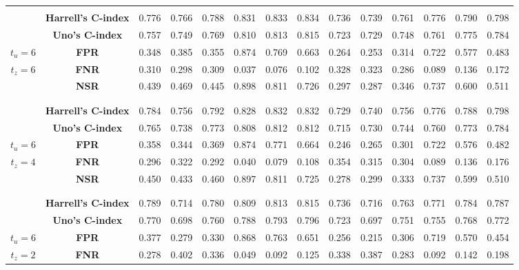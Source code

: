 \begin{table}[!htbp]
\begin{tabular}{c|c|cccccc|cccccc}
\hline
& & & & & & & & & & & & & \\
 & {\bf Harrell’s C-index} & 0.776 & 0.766 & 0.788 & 0.831 & 0.833 & 0.834 & 0.736 & 0.739 & 0.761 & 0.776 & 0.790 & 0.798 \\
 & {\bf Uno's C-index} & 0.757 & 0.749 & 0.769 & 0.810 & 0.813 & 0.815 & 0.723 & 0.729 & 0.748 & 0.761 & 0.775 & 0.784 \\
$t_u=6$ & {\bf FPR} & 0.348 & 0.385 & 0.355 & 0.874 & 0.769 & 0.663 & 0.264 & 0.253 & 0.314 & 0.722 & 0.577 & 0.483 \\
$t_z=6$ & {\bf FNR} & 0.310 & 0.298 & 0.309 & 0.037 & 0.076 & 0.102 & 0.328 & 0.323 & 0.286 & 0.089 & 0.136 & 0.172 \\
 & {\bf NSR} & 0.439 & 0.469 & 0.445 & 0.898 & 0.811 & 0.726 & 0.297 & 0.287 & 0.346 & 0.737 & 0.600 & 0.511 \\
& & & & & & & & & & & & & \\
\hline
& & & & & & & & & & & & & \\
 & {\bf Harrell’s C-index} & 0.784 & 0.756 & 0.792 & 0.828 & 0.832 & 0.832 & 0.729 & 0.740 & 0.756 & 0.776 & 0.788 & 0.798 \\
 & {\bf Uno's C-index} & 0.765 & 0.738 & 0.773 & 0.808 & 0.812 & 0.812 & 0.715 & 0.730 & 0.744 & 0.760 & 0.773 & 0.784 \\
$t_u=6$ & {\bf FPR} & 0.358 & 0.344 & 0.369 & 0.874 & 0.771 & 0.664 & 0.246 & 0.265 & 0.301 & 0.722 & 0.576 & 0.482 \\
$t_z=4$ & {\bf FNR} & 0.296 & 0.322 & 0.292 & 0.040 & 0.079 & 0.108 & 0.354 & 0.315 & 0.304 & 0.089 & 0.136 & 0.176 \\
 & {\bf NSR} & 0.450 & 0.433 & 0.460 & 0.897 & 0.811 & 0.725 & 0.278 & 0.299 & 0.333 & 0.737 & 0.599 & 0.510 \\
& & & & & & & & & & & & & \\
\hline
& & & & & & & & & & & & & \\
 & {\bf Harrell’s C-index} & 0.789 & 0.714 & 0.780 & 0.809 & 0.813 & 0.815 & 0.736 & 0.716 & 0.763 & 0.771 & 0.784 & 0.787 \\
 & {\bf Uno's C-index} & 0.770 & 0.698 & 0.760 & 0.788 & 0.793 & 0.796 & 0.723 & 0.697 & 0.751 & 0.755 & 0.768 & 0.772 \\
$t_u=6$ & {\bf FPR} & 0.377 & 0.279 & 0.330 & 0.868 & 0.763 & 0.651 & 0.256 & 0.215 & 0.306 & 0.719 & 0.570 & 0.454 \\
$t_z=2$ & {\bf FNR} & 0.278 & 0.402 & 0.336 & 0.049 & 0.092 & 0.125 & 0.338 & 0.387 & 0.283 & 0.092 & 0.142 & 0.198 \\

\end{tabular}
\end{table}
